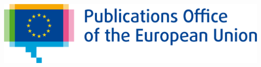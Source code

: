 \begin{titlepage}
\begin{center}

\begin{center}
	\begin{center}
		\setlength{\tabcolsep}{0pt}
	\includegraphics[width=0.45\linewidth]{images/logos/EU-OP.png}
\end{center}


  \vspace{2mm}

  \end{center}
  \vspace{5cm}
  \textbf{{\large \DelInitiative\\}}
  \vspace{2cm}
  
  \begin{spacing}{2.5}
    \textbf{\Huge \DelTitle}\\ \vspace{2cm}
  \end{spacing}
  
  
  
  \vspace*{\fill}  
   
  

\end{center}
\end{titlepage}

